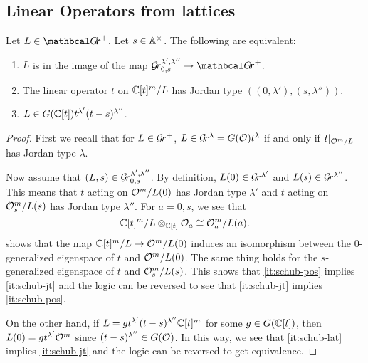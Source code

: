 \documentclass{article}
\begin{document}
\subsection{Linear Operators from lattices}\label{s:latticefacts}
% 
\begin{lemma}\label{le:Grl1l2}
    Let $ L \in \Grth^+ $.  Let $ s \in {\mathbb A^\times}$. The following are equivalent:
    \begin{enumerate}[label=(\roman*)]
        \item \label{it:schub-pos} $ L $ is in the image of the map $ \Gr^{\lambda', \lambda''}_{0,s} \rightarrow \Grth^+$. 
        \item \label{it:schub-jt} The linear operator $ t $ on $ \mathbb C[t]^m/L$ has Jordan type $((0,\lambda'), (s,\lambda''))$.
        \item \label{it:schub-lat} $ L \in G(\mathbb C[t]) t^{\lambda'} (t-s)^{\lambda''}$.
    \end{enumerate}
\end{lemma}
% 
\begin{proof}
First we recall that for $ L \in \mathcal{G}\!r^+$, $ L \in \mathcal{G}\!r^{\lambda} = G(\mathcal O)t^\lambda $ if and only if $ t |_{\mathcal O^m/L} $ has Jordan type $ \lambda$. 

Now assume that $ (L, s) \in \mathcal{G}\!r^{\lambda', \lambda''}_{0,s}$.  By definition, $ L(0) \in \mathcal{G}\!r^{\lambda'}$ and $L(s) \in \mathcal{G}\!r^{\lambda''} $.  This means that $t $ acting on $\mathcal O^m/L(0)$ has Jordan type $ \lambda'$ and $ t$ acting on $\mathcal O_s^m/L(s)$ has Jordan type $ \lambda''$.  For $ a = 0, s$,  we see that $$\mathbb C[t]^m/L \otimes_{\mathbb C[t]} \mathcal O_a \cong \mathcal O_a^m / L(a). $$
 shows that the map $\mathbb C[t]^m/L\to \mathcal O^m/L(0)$ induces an isomorphism between the $0$-generalized eigenspace of $ t$ and $ \mathcal O^m / L(0)$.   The same thing holds for the $s$-generalized eigenspace of $t $ and $ \mathcal O_s^m/L(s)$. This shows that \cref{it:schub-pos} implies \cref{it:schub-jt} and the logic can be reversed to see that \cref{it:schub-jt} implies \cref{it:schub-pos}. 

On the other hand, if $ L = g t^{\lambda'} (t-s)^{\lambda''} \mathbb C[t]^m$ for some $ g \in G(\mathbb C[t])$, then $ L(0) = g t^{\lambda'}\mathcal O^m $ since $ (t-s)^{\lambda''} \in G(\mathcal O)$. In this way, we see that \cref{it:schub-lat} implies \cref{it:schub-jt} and the logic can be reversed to get equivalence.
\end{proof}
\end{document}
